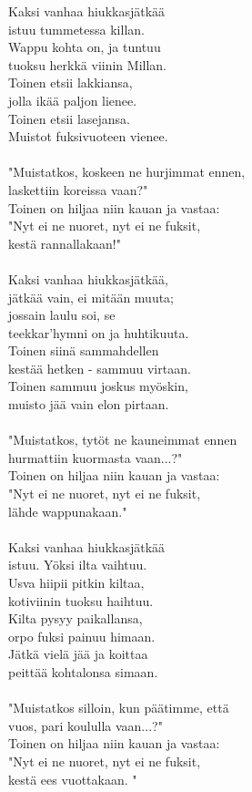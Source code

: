 
Kaksi vanhaa hiukkasjätkää \\ istuu tummetessa killan. \\ Wappu kohta on, ja tuntuu \\ tuoksu herkkä viinin Millan. \\ Toinen etsii lakkiansa, \\ jolla ikää paljon lienee. \\ Toinen etsii lasejansa. \\ Muistot fuksivuoteen vienee. \\ \hspace{10mm} \\ "Muistatkos, koskeen ne hurjimmat ennen, \\ laskettiin koreissa vaan?" \\ Toinen on hiljaa niin kauan ja vastaa: \\ "Nyt ei ne nuoret, nyt ei ne fuksit, \\ kestä rannallakaan!" \\ \hspace{10mm} \\ Kaksi vanhaa hiukkasjätkää, \\ jätkää vain, ei mitään muuta; \\ jossain laulu soi, se \\ teekkar'hymni on ja huhtikuuta. \\ Toinen siinä sammahdellen \\ kestää hetken - sammuu virtaan. \\ Toinen sammuu joskus myöskin, \\ muisto jää vain elon pirtaan. \\ \hspace{10mm} \\ "Muistatkos, tytöt ne kauneimmat ennen \\ hurmattiin kuormasta vaan...?" \\ Toinen on hiljaa niin kauan ja vastaa: \\ "Nyt ei ne nuoret, nyt ei ne fuksit, \\ lähde wappunakaan." \\ \hspace{10mm} \\ Kaksi vanhaa hiukkasjätkää \\ istuu. Yöksi ilta vaihtuu. \\ Usva hiipii pitkin kiltaa, \\ kotiviinin tuoksu haihtuu. \\ Kilta pysyy paikallansa, \\ orpo fuksi painuu himaan. \\ Jätkä vielä jää ja koittaa \\ peittää kohtalonsa simaan. \\ \hspace{10mm} \\ "Muistatkos silloin, kun päätimme, että \\ vuos, pari koululla vaan...?" \\ Toinen on hiljaa niin kauan ja vastaa: \\ "Nyt ei ne nuoret, nyt ei ne fuksit, \\ kestä ees vuottakaan. "